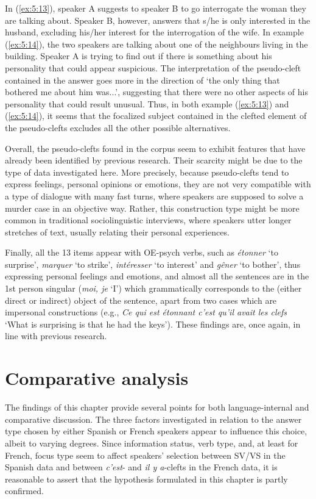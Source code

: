 In (\ref{ex:5:13}), speaker A suggests to speaker B to go interrogate the woman they are talking about. Speaker B, however, answers that s/he is only interested in the husband, excluding his/her interest for the interrogation of the wife. In example (\ref{ex:5:14}), the two speakers are talking about one of the neighbours living in the building. Speaker A is trying to find out if there is something about his personality that could appear suspicious. The interpretation of the pseudo-cleft contained in the answer goes more in the direction of `the only thing that bothered me about him was...', suggesting that there were no other aspects of his personality that could result unusual. Thus, in both example (\ref{ex:5:13}) and (\ref{ex:5:14}), it seems that the focalized subject contained in the clefted element of the pseudo-clefts excludes all the other possible alternatives.

Overall, the pseudo-clefts found in the corpus seem to exhibit features that have already been identified by previous research. Their scarcity might be due to the type of data investigated here. More precisely, because pseudo-clefts tend to express feelings, personal opinions or emotions, they are not very compatible with a type of dialogue with many fast turns, where speakers are supposed to solve a murder case in an objective way. Rather, this construction type might be more common in traditional sociolinguistic interviews, where speakers utter longer stretches of text, usually relating their personal experiences.

Finally, all the 13 items appear with OE-psych verbs, such as \textit{étonner} `to surprise', \textit{marquer} `to strike', \textit{intéresser} `to interest' and \textit{gêner} `to bother', thus expressing personal feelings and emotions, and almost all the sentences are in the 1st person singular (\textit{moi, je} `I') which grammatically corresponds to the (either direct or indirect) object of the sentence, apart from two cases which are impersonal constructions (e.g., \textit{Ce qui est étonnant c'est qu'il avait les clefs} `What is surprising is that he had the keys'). These findings are, once again, in line with previous research.

\section{Comparative analysis} \label{sub:6.10}

The findings of this chapter provide several points for both language-internal and comparative discussion. The three factors investigated in relation to the answer type chosen by either Spanish or French speakers appear to influence this choice, albeit to varying degrees. Since information status, verb type, and, at least for French, focus type seem to affect speakers' selection between SV/VS in the Spanish data and between \textit{c'est}- and \textit{il y a}-clefts in the French data, it is reasonable to assert that the hypothesis formulated in this chapter is partly confirmed.

